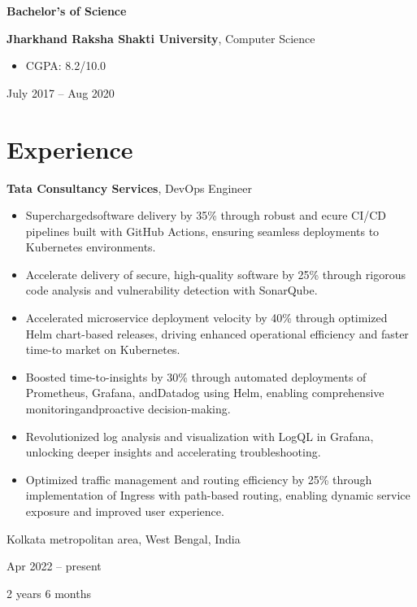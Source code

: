 \documentclass[10pt, letterpaper]{article}
\newenvironment{highlights}{
    \begin{itemize}[
        topsep=0.10 cm,
        parsep=0.10 cm,
        partopsep=0pt,
        itemsep=0pt,
        leftmargin=0.4 cm + 10pt
    ]
}{
    \end{itemize}
} %
\newenvironment{twocolentry}[2][]{
    \onecolentry
    \def\secondColumn{#2}
    \setcolumnwidth{\fill, 4.5 cm}
    \begin{paracol}{2}
}{
    \switchcolumn \raggedleft \secondColumn
    \end{paracol}
    \endonecolentry
} %
\newenvironment{threecolentry}[3][]{
    \onecolentry
    \def\thirdColumn{#3}
    \setcolumnwidth{1 cm, \fill, 4.5 cm}
    \begin{paracol}{3}
    {\raggedright #2} \switchcolumn
}{
    \switchcolumn \raggedleft \thirdColumn
    \end{paracol}
    \endonecolentry
} %
\begin{document}
        
        \begin{threecolentry}{\textbf{Bachelor's of Science}}{
            July 2017 – Aug 2020
        }
            \textbf{Jharkhand Raksha Shakti University}, Computer Science
            \begin{highlights}
                \item CGPA: 8.2/10.0
            \end{highlights}
        \end{threecolentry}


    
    \section{Experience}



        
        \begin{twocolentry}{
            Kolkata metropolitan area, West Bengal, India

        Apr 2022 – present

        2 years 6 months
        }
            \textbf{Tata Consultancy Services}, DevOps Engineer
            \begin{highlights}
                \item Superchargedsoftware delivery by 35\% through robust and ecure CI/CD pipelines built with GitHub Actions, ensuring seamless deployments to Kubernetes environments.
                \item Accelerate delivery of secure, high-quality software by 25\% through rigorous code analysis and vulnerability detection with SonarQube.
                \item Accelerated microservice deployment velocity by 40\% through optimized Helm chart-based releases, driving enhanced operational efficiency and faster time-to market on Kubernetes.
                \item Boosted time-to-insights by 30\% through automated deployments of Prometheus, Grafana, andDatadog using Helm, enabling comprehensive monitoringandproactive decision-making.
                \item Revolutionized log analysis and visualization with LogQL in Grafana, unlocking deeper insights and accelerating troubleshooting.
                \item Optimized traffic management and routing efficiency by 25\% through implementation of Ingress with path-based routing, enabling dynamic service exposure and improved user experience.
            \end{highlights}
        \end{twocolentry}
\end{document}
